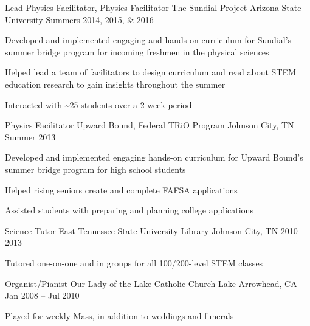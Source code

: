 \begin{cventries}
\cventry
    {Lead Physics Facilitator, Physics Facilitator}
    {\href{http://sundial.physics.asu.edu/}{The Sundial Project}}
    {Arizona State University}
    {Summers 2014, 2015, \& 2016}
    {
    \begin{cvitems}
        \item {Developed and implemented engaging and hands-on curriculum for Sundial's summer bridge program for incoming freshmen in the physical sciences}
        \item {Helped lead a team of facilitators to design curriculum and read about STEM education research to gain insights throughout the summer}
        \item {Interacted with \textasciitilde25 students over a 2-week period}
    \end{cvitems}
    }
    
\cventry
    {Physics Facilitator}
    {Upward Bound, Federal TRiO Program}
    {Johnson City, TN}
    {Summer 2013}
    {
    \begin{cvitems}
        \item {Developed and implemented engaging hands-on curriculum for Upward Bound's summer bridge program for high school students}
        \item {Helped rising seniors create and complete FAFSA applications}
        \item {Assisted students with preparing and planning college applications}
    \end{cvitems}
    }
    
\cventry
    {Science Tutor}
    {East Tennessee State University Library}
    {Johnson City, TN}
    {2010 -- 2013}
    {
    \begin{cvitems}
        \item {Tutored one-on-one and in groups for all 100/200-level STEM classes}
    \end{cvitems}
    }
    
\cventry
    {Organist/Pianist}
    {Our Lady of the Lake Catholic Church}
    {Lake Arrowhead, CA}
    {Jan 2008 -- Jul 2010}
    {
    \begin{cvitems}
        \item {Played for weekly Mass, in addition to weddings and funerals}
    \end{cvitems}
    }
    
\end{cventries}